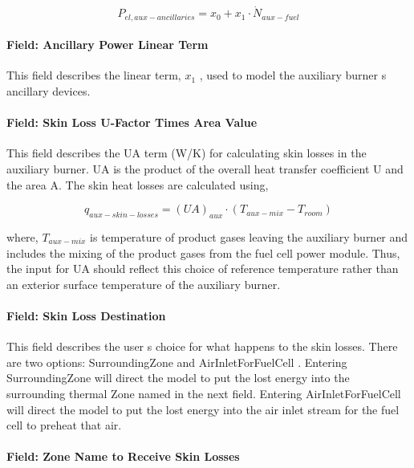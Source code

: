 \begin{equation}
{P_{el,aux - ancillaries}} = {x_0} + {x_1} \cdot {\dot N_{aux - fuel}}
\end{equation}

\paragraph{Field: Ancillary Power Linear Term}\label{field-ancillary-power-linear-term}

This field describes the linear term, \({x_1}\) , used to model the auxiliary burner s ancillary devices.

\paragraph{Field: Skin Loss U-Factor Times Area Value}\label{field-skin-loss-u-factor-times-area-value-1}

This field describes the UA term (W/K) for calculating skin losses in the auxiliary burner. UA is the product of the overall heat transfer coefficient U and the area A. The skin heat losses are calculated using,

\begin{equation}
{q_{aux - skin - losses}} = {(UA)_{aux}} \cdot ({T_{aux - mix}} - {T_{room}})
\end{equation}

where, \({T_{aux - mix}}\) is temperature of product gases leaving the auxiliary burner and includes the mixing of the product gases from the fuel cell power module. Thus, the input for UA should reflect this choice of reference temperature rather than an exterior surface temperature of the auxiliary burner.

\paragraph{Field: Skin Loss Destination}\label{field-skin-loss-destination}

This field describes the user s choice for what happens to the skin losses. There are two options: SurroundingZone and AirInletForFuelCell . Entering SurroundingZone will direct the model to put the lost energy into the surrounding thermal Zone named in the next field. Entering AirInletForFuelCell will direct the model to put the lost energy into the air inlet stream for the fuel cell to preheat that air.

\paragraph{Field: Zone Name to Receive Skin Losses}\label{field-zone-name-to-receive-skin-losses}


